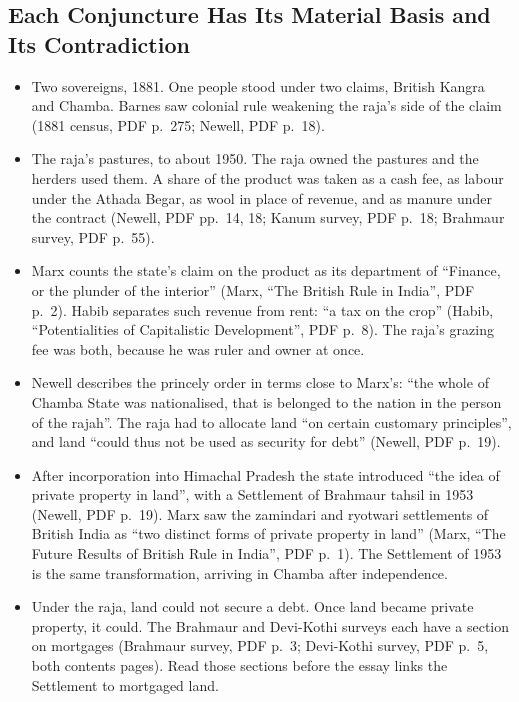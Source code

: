 \documentclass[11pt,a4paper]{article}
\newcommand{\cit}[1]{{\small(#1)}}
\newcommand{\Habib}{Habib, \enquote{Potentialities of Capitalistic Development}}
\begin{document}
\subsection{Each Conjuncture Has Its Material Basis and Its Contradiction}
\begin{itemize}
\item Two sovereigns, 1881. One people stood under two claims, British Kangra
  and Chamba. Barnes saw colonial rule weakening the raja's side of the claim
  \cit{1881 census, PDF p.~275; Newell, PDF p.~18}.
\item The raja's pastures, to about 1950. The raja owned the pastures and the
  herders used them. A share of the product was taken as a cash fee, as labour
  under the Athada Begar, as wool in place of revenue, and as manure under the
  contract \cit{Newell, PDF pp.~14, 18; Kanum survey, PDF p.~18; Brahmaur
  survey, PDF p.~55}.
\item Marx counts the state's claim on the product as its department of
  \enquote{Finance, or the plunder of the interior} \cit{Marx, \enquote{The
  British Rule in India}, PDF p.~2}. Habib separates such revenue from rent:
  \enquote{a tax on the crop} \cit{\Habib, PDF p.~8}. The raja's grazing fee
  was both, because he was ruler and owner at once.
\item Newell describes the princely order in terms close to Marx's: \enquote{the
  whole of Chamba State was nationalised, that is belonged to the nation in the
  person of the rajah}. The raja had to allocate land \enquote{on certain
  customary principles}, and land \enquote{could thus not be used as security for
  debt} \cit{Newell, PDF p.~19}.
\item After incorporation into Himachal Pradesh the state introduced
  \enquote{the idea of private property in land}, with a Settlement of Brahmaur
  tahsil in 1953 \cit{Newell, PDF p.~19}. Marx saw the zamindari and ryotwari
  settlements of British India as \enquote{two distinct forms of private property
  in land} \cit{Marx, \enquote{The Future Results of British Rule in India}, PDF
  p.~1}. The Settlement of 1953 is the same transformation, arriving in Chamba
  after independence.
\item Under the raja, land could not secure a debt. Once land became private
  property, it could. The Brahmaur and Devi-Kothi surveys each have a section on
  mortgages \cit{Brahmaur survey, PDF p.~3; Devi-Kothi survey, PDF p.~5, both
  contents pages}. Read those sections before the essay links the Settlement to
  mortgaged land.

\end{itemize}
\end{document}
